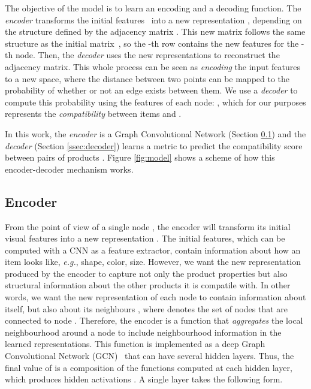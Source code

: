 \documentclass[10pt,twocolumn,letterpaper]{article}
\begin{document}
The objective of the model is to learn an encoding  and a decoding  function. The \emph{encoder} transforms the initial features~ into a new representation , depending on the structure defined by the adjacency matrix . This new matrix follows the same structure as the initial matrix~, so the -th row  contains the new features for the -th node. Then, the \emph{decoder} uses the new representations to reconstruct the adjacency matrix. This whole process can be seen as \emph{encoding} the input features to a new space, where the distance between two points can be mapped to the probability of whether or not an edge exists between them.
We use a \emph{decoder} to compute this probability using the features of each node: , which for our purposes represents the \emph{compatibility} between items  and .



In this work, the \emph{encoder} is a Graph Convolutional Network (Section \ref{ssec:encoder}) and the \emph{decoder} (Section \ref{ssec:decoder}) learns a metric to predict the compatibility score between pairs of products . Figure \ref{fig:model} shows a scheme of how this encoder-decoder mechanism works.


\subsection{Encoder}
\label{ssec:encoder}
From the point of view of a single node , the encoder will transform its initial visual features  into a new representation . The initial features, which can be computed with a CNN as a feature extractor, contain information about how an item looks like, \textit{e.g.}, shape, color, size. However, we want the new representation produced by the encoder to capture not only the product properties but also structural information about the other products it is compatile with. In other words, we want the new representation of each node to contain information about itself, but also about its neighbours , where  denotes the set of nodes that are connected to node . Therefore, the encoder is a function that \emph{aggregates} the local neighbourhood around a node  to include neighbourhood information in the learned representations. This function is implemented as a deep Graph Convolutional Network (GCN)~\cite{kipf2016semi} that can have several hidden layers. 
Thus, the final value of  is a composition of the functions computed at each hidden layer, which produces hidden activations . A single layer takes the following form.
\end{document}
